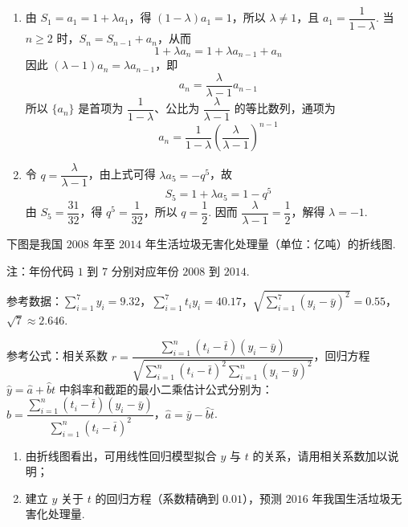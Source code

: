 \begin{solution}
\begin{enumerate}
\item 由 \(S_1=a_1=1+\lambda a_1\)，得 \((1-\lambda)a_1=1\)，所以 \(\lambda\ne1\)，且 \(a_1=\dfrac{1}{1-\lambda}\). 当 \(n\ge2\) 时，\(S_n=S_{n-1}+a_n\)，从而
\[
1+\lambda a_n=1+\lambda a_{n-1}+a_n
\]
因此 \((\lambda-1)a_n=\lambda a_{n-1}\)，即
\[
a_n=\frac{\lambda}{\lambda-1}a_{n-1}
\]
所以 \(\{a_n\}\) 是首项为 \(\dfrac{1}{1-\lambda}\)、公比为 \(\dfrac{\lambda}{\lambda-1}\) 的等比数列，通项为
\[
a_n=\frac{1}{1-\lambda}\left(\frac{\lambda}{\lambda-1}\right)^{n-1}
\]

\item 令 \(q=\dfrac{\lambda}{\lambda-1}\)，由上式可得 \(\lambda a_5=-q^5\)，故
\[
S_5=1+\lambda a_5=1-q^5
\]
由 \(S_5=\dfrac{31}{32}\)，得 \(q^5=\dfrac{1}{32}\)，所以 \(q=\dfrac12\). 因而 \(\dfrac{\lambda}{\lambda-1}=\dfrac12\)，解得 \(\lambda=-1\).
\end{enumerate}
\end{solution}

\begin{problem}
下图是我国 \(2008\) 年至 \(2014\) 年生活垃圾无害化处理量（单位：亿吨）的折线图.

注：年份代码 \(1\) 到 \(7\) 分别对应年份 \(2008\) 到 \(2014\).

参考数据：\(\sum_{i=1}^{7}y_i=9.32\)，\(\sum_{i=1}^{7}t_iy_i=40.17\)，\(\sqrt{\sum_{i=1}^{7}\left(y_i-\bar y\right)^2}=0.55\)，\(\sqrt7\approx2.646\).

参考公式：相关系数 \(r=\dfrac{\sum_{i=1}^{n}\left(t_i-\bar t\right)\left(y_i-\bar y\right)}{\sqrt{\sum_{i=1}^{n}\left(t_i-\bar t\right)^2\sum_{i=1}^{n}\left(y_i-\bar y\right)^2}}\)，回归方程 \(\hat y=\hat a+\hat b t\) 中斜率和截距的最小二乘估计公式分别为：\(\hat b=\dfrac{\sum_{i=1}^{n}\left(t_i-\bar t\right)\left(y_i-\bar y\right)}{\sum_{i=1}^{n}\left(t_i-\bar t\right)^2}\)，\(\hat a=\bar y-\hat b\bar t\).

\begin{enumerate}
\item 由折线图看出，可用线性回归模型拟合 \(y\) 与 \(t\) 的关系，请用相关系数加以说明；
\item 建立 \(y\) 关于 \(t\) 的回归方程（系数精确到 \(0.01\)），预测 \(2016\) 年我国生活垃圾无害化处理量.
\end{enumerate}

\begingroup
{}
\endgroup
\end{problem}

